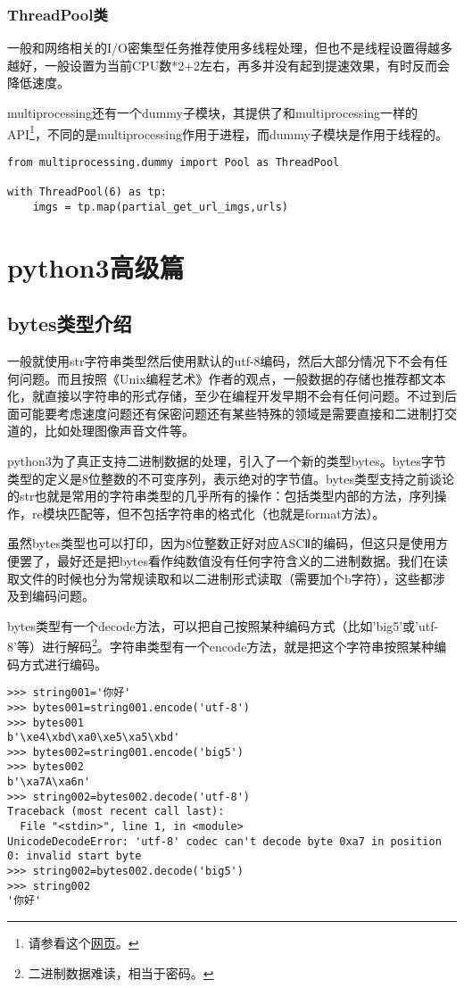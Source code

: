 \documentclass[12pt,oneside]{book}
\begin{document}
\begin{common-format}
\section{ThreadPool类}
一般和网络相关的I/O密集型任务推荐使用多线程处理，但也不是线程设置得越多越好，一般设置为当前CPU数*2+2左右，再多并没有起到提速效果，有时反而会降低速度。

multiprocessing还有一个dummy子模块，其提供了和multiprocessing一样的API\footnote{请参看这个\href{http://segmentfault.com/blog/caspar/1190000000414339b}{网页}。}，不同的是multiprocessing作用于进程，而dummy子模块是作用于线程的。


\begin{Verbatim}
from multiprocessing.dummy import Pool as ThreadPool

with ThreadPool(6) as tp:
    imgs = tp.map(partial_get_url_imgs,urls)
\end{Verbatim}


\part{python3高级篇}


\chapter{bytes类型介绍}
一般就使用str字符串类型然后使用默认的utf-8编码，然后大部分情况下不会有任何问题。而且按照《Unix编程艺术》作者的观点，一般数据的存储也推荐都文本化，就直接以字符串的形式存储，至少在编程开发早期不会有任何问题。不过到后面可能要考虑速度问题还有保密问题还有某些特殊的领域是需要直接和二进制打交道的，比如处理图像声音文件等。

python3为了真正支持二进制数据的处理，引入了一个新的类型bytes。bytes字节类型的定义是8位整数的不可变序列，表示绝对的字节值。bytes类型支持之前谈论的str也就是常用的字符串类型的几乎所有的操作：包括类型内部的方法，序列操作，re模块匹配等，但不包括字符串的格式化（也就是format方法）。

虽然bytes类型也可以打印，因为8位整数正好对应ASCⅡ的编码，但这只是使用方便罢了，最好还是把bytes看作纯数值没有任何字符含义的二进制数据。我们在读取文件的时候也分为常规读取和以二进制形式读取（需要加个b字符），这些都涉及到编码问题。

bytes类型有一个decode方法，可以把自己按照某种编码方式（比如'big5'或'utf-8'等）进行解码\footnote{二进制数据难读，相当于密码。}。字符串类型有一个encode方法，就是把这个字符串按照某种编码方式进行编码。
\begin{Verbatim}
>>> string001='你好'
>>> bytes001=string001.encode('utf-8')
>>> bytes001
b'\xe4\xbd\xa0\xe5\xa5\xbd'
>>> bytes002=string001.encode('big5')
>>> bytes002
b'\xa7A\xa6n'
>>> string002=bytes002.decode('utf-8')
Traceback (most recent call last):
  File "<stdin>", line 1, in <module>
UnicodeDecodeError: 'utf-8' codec can't decode byte 0xa7 in position 0: invalid start byte
>>> string002=bytes002.decode('big5')
>>> string002
'你好'
\end{Verbatim}


\end{common-format}
\end{document}
